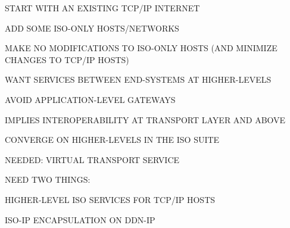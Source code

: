 \begin{bwslide}

\begin{nrtc}
\item	START WITH AN EXISTING TCP/IP INTERNET

\item	ADD SOME ISO-ONLY HOSTS/NETWORKS

\item	MAKE NO MODIFICATIONS TO ISO-ONLY HOSTS
	(AND MINIMIZE CHANGES TO TCP/IP HOSTS)
\end{nrtc}
\end{bwslide}


\begin{bwslide}

\begin{nrtc}
\item	WANT SERVICES BETWEEN END-SYSTEMS AT HIGHER-LEVELS

\item	AVOID APPLICATION-LEVEL GATEWAYS

\item	IMPLIES INTEROPERABILITY AT TRANSPORT LAYER AND ABOVE

\item	CONVERGE ON HIGHER-LEVELS IN THE ISO SUITE

\item	NEEDED: VIRTUAL TRANSPORT SERVICE
\end{nrtc}
\end{bwslide}


\begin{bwslide}

\vspace{0.25in}
\end{bwslide}


\begin{bwslide}

\vspace{0.25in}
\end{bwslide}


\begin{bwslide}

\begin{nrtc}
\item	NEED TWO THINGS:
    \begin{nrtc}
    \item	HIGHER-LEVEL ISO SERVICES FOR TCP/IP HOSTS

    \item	ISO-IP ENCAPSULATION ON DDN-IP
    \end{nrtc}
\end{nrtc}
\end{bwslide}


